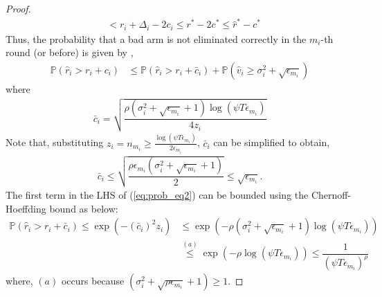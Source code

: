 \begin{proof}
\begin{align*}
 &< r_{i} + \Delta_{i} - 2c_{i}
 \leq r^{*} -2c^{*} 
 \leq \hat{r}^{*} - c^{*}
  \end{align*}
	\noindent
	Thus, the probability that a bad arm is not eliminated correctly in the $m_i$-th round (or before) is given by ,
\begin{align}
\mathbb{P}(\hat{r}_{i}> r_{i} + c_{i})
&\leq \mathbb{P}\left( \hat{r}_{i} > r_{i}+ \bar{c}_i\right) 
+ \mathbb{P}\left( \hat{v}_{i}\geq \sigma_{i}^{2}+\sqrt{\epsilon_{m_{i}}}\right)\label{eq:prob_eq2}
\end{align}
where 
\begin{align*}
\bar{c}_i=\sqrt{\dfrac{\rho (\sigma_{i}^{2}+\sqrt{\epsilon_{m_{i}}} + 1)\log(\psi T\epsilon_{m_{i}})}{4z_{i}}}
\end{align*}
Note that, substituting $ z_i = n_{m_i} \geq \frac{\log{(\psi T\epsilon_{m_{i}})}}{2\epsilon_{m_{i}}}$, $\bar{c}_i$ can be simplified to obtain,
\begin{align}
\bar{c}_i
\leq \sqrt{\dfrac{\rho\epsilon_{m_{i}}(\sigma_{i}^{2}+\sqrt{\epsilon_{m_{i}}} + 1)}{2}}\leq \sqrt{ \epsilon_{m_{i}}}.
\label{si_bar_equn}
\end{align}
The first term in the LHS of (\ref{eq:prob_eq2}) can be bounded using the Chernoff-Hoeffding bound as below:
\begin{align}
\mathbb{P}\left( \hat{r}_{i} > r_{i}+ \bar{c}_i\right)\nonumber 
\le \exp\left(- (\bar{c}_i)^2 z_i \right)\nonumber 
 &\le \exp\left(- \rho (\sigma_{i}^{2}+\sqrt{\epsilon_{m_{i}}} + 1)\log(\psi  T\epsilon_{m_{i}})\right)\nonumber \\
& \overset{(a)}{\leq} \exp\left(- \rho \log(\psi  T\epsilon_{m_{i}})\right) 
\le \dfrac{1}{(\psi  T\epsilon_{m_{i}})^{\rho}}
\label{lhs1_equn}
\end{align}
where, $(a)$ occurs because $(\sigma_{i}^{2}+\sqrt{\rho\epsilon_{m_{i}}} + 1) \geq 1$.


\end{proof}
